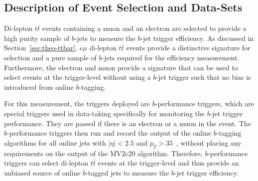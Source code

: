\subsection{Description of Event Selection and Data-Sets}
\label{sec:trig-evtSel}

Di-lepton $t\bar{t}$ events containing a muon and an electron are selected to provide a high purity sample of $b$-jets to measure the $b$-jet trigger efficiency.
As discussed in Section~\ref{sec:theo-ttbar}, 
$e\mu$ di-lepton $t\bar{t}$ events provide a distinctive signature for selection and a pure sample of $b$-jets required for the efficiency measurement.
Furthermore, the electron and muon provide a signature that can be used to select events at the trigger-level without using a $b$-jet trigger
such that no bias is introduced from online $b$-tagging.

For this measurement, the triggers deployed are $b$-performance triggers,
which are special triggers used in data-taking specifically for monitoring the $b$-jet trigger performance.
They are passed if there is an electron or a muon in the event.
The $b$-performance triggers then run and record the output of the online $b$-tagging algorithms for all online jets with $|\eta|<2.5$ and
\mbox{$p_{T}>35$~\GeV}, without placing any requirements on the output of the MV2c20 algorithm.
Therefore, $b$-performance triggers can select  di-lepton $t\bar{t}$ events at the trigger-level
and thus provide an unbiased source of online $b$-tagged jets to measure the $b$-jet trigger efficiency.

